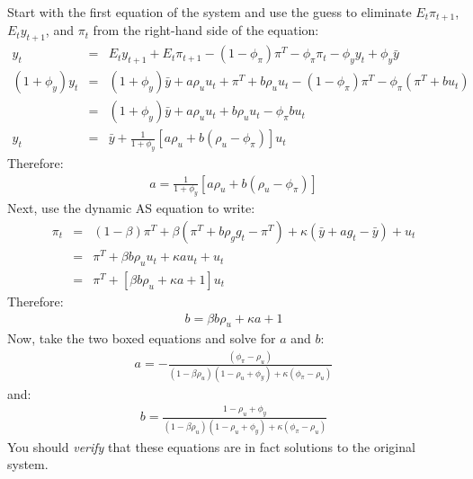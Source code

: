 \documentclass[12pt,fleqn]{article}
\newcommand{\EE}{\begin{eqnarray}}
\newcommand{\FF}{\end{eqnarray}}
\begin{document}
\begin{appendix}
Start with the first equation of the system and use the guess to eliminate $E_t\pi_{t+1}$, $E_ty_{t+1}$, and $\pi_t$ from the right-hand side of the equation:
	\EE
	y_t & = & E_t y_{t+1} + E_t\pi_{t+1}  - (1-\phi_{\pi})\pi^T - \phi_{\pi}\pi_t - \phi_y y_t + \phi_y \bar{y}\\
	(1+\phi_y) y_t & = & (1+\phi_y)\bar{y} + a \rho_uu_t + \pi^T + b \rho_uu_t - (1-\phi_{\pi})\pi^T - \phi_{\pi}( \pi^T + b u_t)\\
	& = & (1+\phi_y)\bar{y} + a \rho_uu_t + b \rho_uu_t - \phi_{\pi}b u_t \\
	y_t & = & \bar{y} + \frac{1}{1+\phi_y}\left[a \rho_u + b (\rho_u - \phi_{\pi})\right]u_t
	\FF
Therefore:
	\EE
	\boxed{a  = \frac{1}{1+\phi_y}\left[a \rho_u + b (\rho_u - \phi_{\pi})\right]}
	\FF
Next, use the dynamic AS equation to write:
	\EE
	\pi_t & = & (1-\beta) \pi^T + \beta \left( \pi^T + b \rho_gg_t - \pi^T\right)  + \kappa (\bar{y} + a g_t -\bar{y}) + u_t\\
	& = & \pi^T + \beta b \rho_uu_t + \kappa a u_t + u_t\\
	& = & \pi^T + \left[ \beta b \rho_u + \kappa a + 1\right]u_t
	\FF
Therefore:
	\EE
	\boxed{b = \beta b \rho_u + \kappa a + 1}
	\FF
Now, take the two boxed equations and solve for $a$ and $b$:
	\EE
	\boxed{a = -\frac{(\phi_{\pi} - \rho_u)}{(1-\beta\rho_u)(1-\rho_u+\phi_y)+ \kappa(\phi_{\pi}-\rho_u)}}
	\FF
	and:
	\EE
	\boxed{b = \frac{1-\rho_u+\phi_y}{(1-\beta\rho_u)(1-\rho_u+\phi_y)+ \kappa(\phi_{\pi}-\rho_u)}}
	\FF
You should \emph{verify} that these equations are in fact solutions to the original system.


\end{appendix}

%
\end{document}
